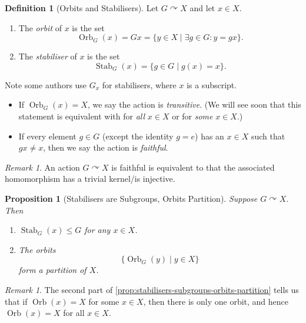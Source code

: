 \documentclass{article}
\newtheorem{proposition}[theorem]{Proposition}
\theoremstyle{definition}
\newtheorem{definition}[theorem]{Definition}
\theoremstyle{remark}
\newtheorem{remark}[theorem]{Remark}
\newcommand{\pqty}[1]{\left(#1\right)}
\newcommand{\set}[2]{\{#1\mid #2\}}
\newcommand{\subgroup}{\leq}
\newcommand{\actson}{\curvearrowright}
\newcommand{\Stab}{\operatorname{Stab}}
\newcommand{\Orb}{\operatorname{Orb}}
\begin{document}
\begin{definition}[Orbits and Stabilisers]
    \label{def:orbit-stabiliser}%
    Let \(G \actson X\) and let \(x \in X\).
    \begin{enumerate}
        \item The \emph{orbit} of \(x\) is the set
        \[
            \Orb_{G}\pqty{x} = Gx = \set{y \in X}{\exists g \in G: y = gx}.
        \]
        \item The \emph{stabiliser} of \(x\) is the set
        \[
            \Stab_{G}\pqty{x} = \set{g \in G}{g\pqty{x} = x}.
        \]
    \end{enumerate}

    Note some authors use \(G_x\) for stabilisers, where \(x\) is a subscript.

    \begin{itemize}
        \item If \(\Orb_{G}\pqty{x} = X\), we say the action is \emph{transitive}. (We will see soon that this statement is equivalent with for \emph{all} \(x \in X\) or for \emph{some} \(x \in X\).)
        \item If every element \(g \in G\) (except the identity \(g = e\)) has an \(x \in X\) such that \(gx \neq x\), then we say the action is \emph{faithful}.
    \end{itemize}
\end{definition}

\begin{remark}
    An action \(G \actson X\) is faithful is equivalent to that the associated homomorphism has a trivial kernel/is injective.
\end{remark}

\begin{proposition}[Stabilisers are Subgroups, Orbits Partition]
    \label{prop:stabilisers-subgroups-orbits-partition}%
    Suppose \(G \actson X\). Then
    \begin{enumerate}
        \item \(\Stab_{G} \pqty{x} \subgroup G\) for any \(x \in X\).
        \item The orbits
        \[
            \set{\Orb_{G}\pqty{y}}{y \in X}
        \]
        form a partition of \(X\).
    \end{enumerate}
\end{proposition}

\begin{remark}
    The second part of \autoref{prop:stabilisers-subgroups-orbits-partition} tells us that if \(\Orb\pqty{x} = X\) for some \(x \in X\), then there is only one orbit, and hence \(\Orb\pqty{x} = X\) for all \(x \in X\).
\end{remark}
\end{document}
